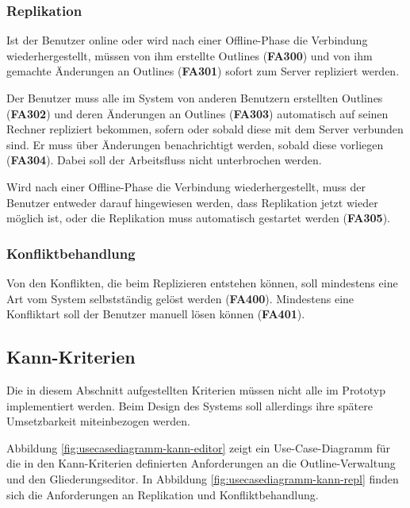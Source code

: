 \subsubsection{Replikation}

Ist der Benutzer online oder wird nach einer Offline-Phase die Verbindung wiederhergestellt, müssen von ihm erstellte Outlines (\textbf{FA300}) und von ihm gemachte Änderungen an Outlines (\textbf{FA301}) sofort zum Server repliziert werden. 

Der Benutzer muss alle im System von anderen Benutzern erstellten Outlines (\textbf{FA302}) und deren Änderungen an Outlines (\textbf{FA303}) automatisch auf seinen Rechner repliziert bekommen, sofern oder sobald diese mit dem Server verbunden sind. Er muss über Änderungen benachrichtigt werden, sobald diese vorliegen (\textbf{FA304}). Dabei soll der Arbeitsfluss nicht unterbrochen werden.

Wird nach einer Offline-Phase die Verbindung wiederhergestellt, muss der Benutzer entweder darauf hingewiesen werden, dass Replikation jetzt wieder möglich ist, oder die Replikation muss automatisch gestartet werden (\textbf{FA305}).

\subsubsection{Konfliktbehandlung}

Von den Konflikten, die beim Replizieren entstehen können, soll mindestens eine Art vom System selbstständig gelöst werden (\textbf{FA400}). Mindestens eine Konfliktart soll der Benutzer manuell lösen können (\textbf{FA401}).

\subsection{Kann-Kriterien}
\label{subsec:kann}

Die in diesem Abschnitt aufgestellten Kriterien müssen nicht alle im Prototyp implementiert werden. Beim Design des Systems soll allerdings ihre spätere Umsetzbarkeit miteinbezogen werden.

Abbildung \ref{fig:usecasediagramm-kann-editor} zeigt ein Use-Case-Diagramm für die in den Kann-Kriterien definierten Anforderungen an die Outline-Verwaltung und den Gliederungseditor. In Abbildung \ref{fig:usecasediagramm-kann-repl} finden sich die Anforderungen an Replikation und Konfliktbehandlung.


